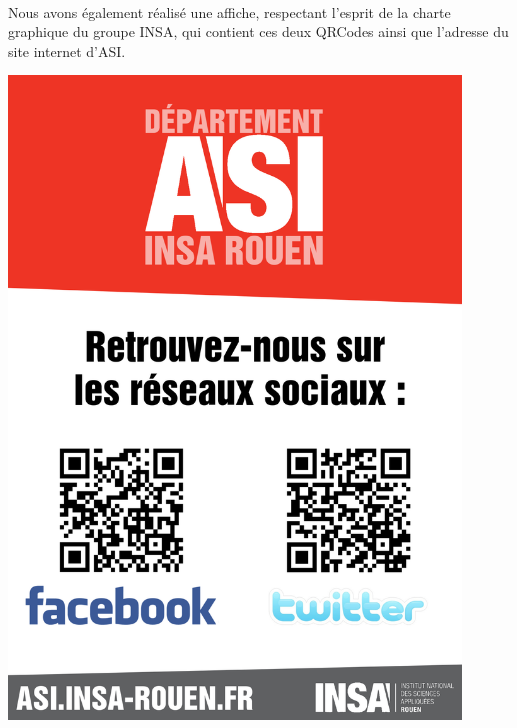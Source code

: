 		\paragraph{}
		Nous avons également réalisé une affiche, respectant l'esprit de la charte graphique du groupe INSA, qui contient ces deux QRCodes ainsi que l'adresse du site internet d'ASI.

		\begin{center}
			\includegraphics[width=0.9\textwidth]{images/affiche.jpg}
		\end{center}
